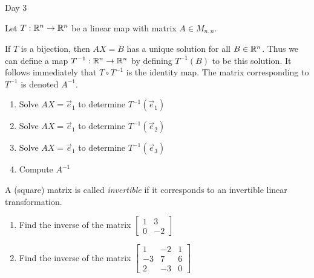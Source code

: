 
\begin{applicationActivities}{Day 3}

\begin{activity}
  Let $T: \mathbb{R}^n \rightarrow \mathbb{R}^n$ be a linear map with matrix $A \in M_{n,n}$.

  If $T$ is a bijection, then $AX=B$ has a unique solution for all $B \in \mathbb{R}^n$.  Thus we can define a map $T^{-1} : \mathbb{R}^n \rightarrow \mathbb{R}^n$ by defining $T^{-1}(B)$ to be this solution.  It follows immediately that $T \circ T^{-1}$ is the identity map.  The matrix corresponding to $T^{-1}$ is denoted $A^{-1}$.

  \begin{enumerate}[1)]
  \item Solve $AX=\vec{e}_1$ to determine $T^{-1}(\vec{e}_1)$
  \item Solve $AX=\vec{e}_1$ to determine $T^{-1}(\vec{e}_2)$
  \item Solve $AX=\vec{e}_1$ to determine $T^{-1}(\vec{e}_3)$
  \item Compute $A^{-1}$
  \end{enumerate}

  A (square) matrix is called {\em invertible} if it corresponds to an invertible linear transformation.

  \begin{enumerate}[1)]
  \item Find the inverse of the matrix $\begin{bmatrix} 1 & 3 \\ 0 & -2 \end{bmatrix}$
  \item Find the inverse of the matrix $\begin{bmatrix} 1 & -2 & 1 \\ -3 & 7 & 6 \\ 2 & -3 & 0 \end{bmatrix}$
  \end{enumerate}
\end{activity}

\end{applicationActivities}
